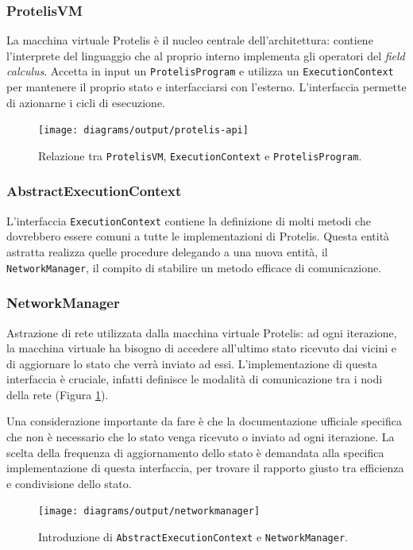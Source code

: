\subsubsection{ProtelisVM}
La macchina virtuale Protelis è il nucleo centrale dell'architettura: contiene
l'interprete del linguaggio che al proprio interno implementa gli operatori del
\textit{field calculus}. Accetta in input un \texttt{ProtelisProgram} e utilizza un
\texttt{ExecutionContext} per mantenere il proprio stato e interfacciarsi con
l'esterno. L'interfaccia permette di azionarne i cicli di esecuzione.

\begin{figure}
  \centering
  \texttt{[image: diagrams/output/protelis-api]}
  \caption{Relazione tra \texttt{ProtelisVM}, \texttt{ExecutionContext} e
      \texttt{ProtelisProgram}.}
  \label{fig:uml-protelisvm}
\end{figure}

\subsubsection{AbstractExecutionContext}
L'interfaccia \texttt{ExecutionContext} contiene la definizione di molti metodi
che dovrebbero essere comuni a tutte le implementazioni di Protelis. Questa
entità astratta realizza quelle procedure delegando a una nuova entità, il
\texttt{NetworkManager}, il compito di stabilire un metodo efficace di
comunicazione.

\subsubsection{NetworkManager}
\label{sec:network-manager}
Astrazione di rete utilizzata dalla macchina virtuale Protelis: ad ogni
iterazione, la macchina virtuale ha bisogno di accedere all'ultimo stato
ricevuto dai vicini e di aggiornare lo stato che verrà inviato ad
essi. L'implementazione di questa interfaccia è cruciale, infatti definisce le
modalità di comunicazione tra i nodi della rete (Figura
\ref{fig:uml-protelisvm}).

Una considerazione importante da fare è che la documentazione ufficiale
specifica che non è necessario che lo stato venga ricevuto o inviato ad ogni
iterazione. La scelta della frequenza di aggiornamento dello stato è demandata
alla specifica implementazione di questa interfaccia, per trovare il rapporto
giusto tra efficienza e condivisione dello stato.

\begin{figure}
  \centering
  \texttt{[image: diagrams/output/networkmanager]}
    \caption{Introduzione di \texttt{AbstractExecutionContext} e \texttt{NetworkManager}.}
  \label{fig:uml-networkmanager}
\end{figure}

